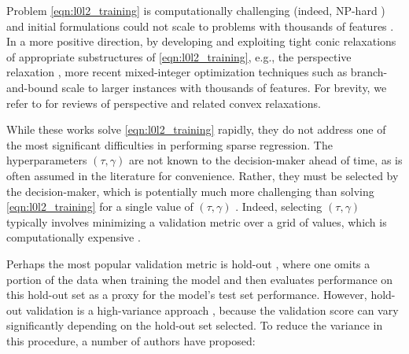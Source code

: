 \documentclass[mnsc,nonblindrev]{informs3} %
\newcommand{\ag}[1]{{\color{black}#1}}
\begin{document}
Problem \eqref{eqn:l0l2_training} is \ag{computationally} challenging {\color{black}(indeed, NP-hard \cite{natarajan1995sparse})} and initial formulations could not scale to problems with thousands of features \citep[][]{hastie2020best}. In a more positive direction, by developing and exploiting tight conic relaxations of appropriate substructures of \eqref{eqn:l0l2_training}, e.g., the perspective relaxation \citep{ceria1999convex}%
, more recent mixed-integer optimization techniques such as branch-and-bound \citep{hazimeh2021sparse} scale to larger instances with thousands of %
features. {\color{black}For brevity, we refer to \cite{atamturk2019rank,bertsimas2021unified} for reviews of perspective and related convex relaxations.}

While these works solve \eqref{eqn:l0l2_training} rapidly, they do not address one of the most significant difficulties {\color{black}in performing sparse regression}. The hyperparameters $(\tau, \gamma)$ 
{\color{black}are not known to the decision-maker ahead of time, as is often assumed in the literature for convenience.}
Rather, they must be selected by {\color{black}the decision-maker}, which is potentially much more challenging than solving \eqref{eqn:l0l2_training} for a single value of $(\tau, \gamma)$ \citep[]{hansen1992new}. Indeed, selecting $(\tau, \gamma)$ typically involves minimizing a validation metric over a grid of values, which is computationally expensive \citep[]{larochelle2007empirical}. 

{\color{black} Perhaps the most popular validation metric is hold-out \citep{hastie2009elements}, where one omits a portion of the data when training the model and then evaluates performance on this hold-out set as a proxy for the model's test set performance. However, hold-out validation is a high-variance approach \citep{hastie2009elements}, because the validation score can vary significantly depending on the hold-out set selected. To reduce the variance in this procedure, a number of authors have proposed:
}
\end{document}
